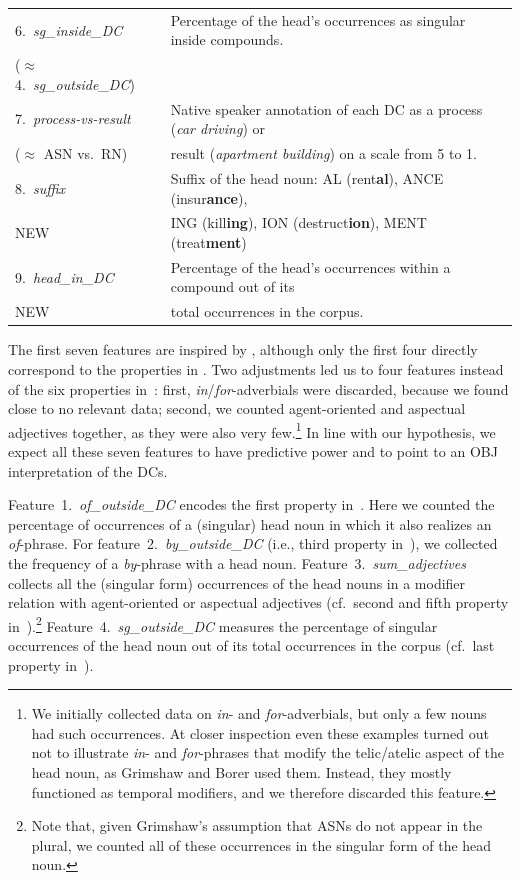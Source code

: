 \documentclass[output=paper]{langsci/langscibook}
\begin{document}
\begin{table}
{\begin{tabular}{|l|l|}
6.\ \textit{sg\_inside\_DC} & Percentage of the head's occurrences as singular inside compounds.\\ 
($\approx$ 4.~\textit{sg\_outside\_DC}) & \\ \hline
7.\ \textit{process-vs-result}& Native speaker annotation of each DC as a process (\textit{car driving}) or  \\ ($\approx$ ASN vs.~RN) & result (\textit{apartment building})  on a scale from 5 to 1.\\
\hline
\hline 
8.\ \textit{suffix} & Suffix of the head noun: AL (rent\textbf{al}), ANCE (insur\textbf{ance}),\\ NEW & 
ING (kill\textbf{ing}), ION (destruct\textbf{ion}), MENT (treat\textbf{ment})\\ \hline
9.\ \textit{head\_in\_DC} & Percentage of the head's occurrences within a compound out of its \\  NEW &  total occurrences in the corpus.\\ \hline
\end{tabular}}
\end{table}


The first seven features are inspired by \cite{grimshaw:90},  {although only the first four directly correspond to the properties in . Two adjustments led us to four features instead of the six properties in~: first, \textit{in}/\textit{for}-adverbials were discarded, because we found close to no relevant data; second, we counted agent-oriented and aspectual adjectives together, as they were also very few.}\footnote{We initially collected data on \textit{in}- and \textit{for}-adverbials, but only a few nouns had such occurrences. At closer inspection even these examples turned out not to illustrate \textit{in}- and \textit{for}-phrases that modify the telic/atelic aspect of the head noun, as Grimshaw and Borer used them. Instead, they mostly functioned as temporal modifiers, and we therefore discarded this feature.}  In line with our hypothesis, we expect all these seven features to have predictive power and to point to an OBJ interpretation of the DCs.

Feature~1.~\textit{of\_outside\_DC} encodes the first property in~. Here we counted the percentage of occurrences of a (singular) head noun in which it also realizes an  \textit{of}-phrase. For feature~2.~\textit{by\_outside\_DC} (i.e., third property in~), we collected the frequency of a \textit{by}-phrase with a head noun. 
 Feature~3.~\textit{sum\_adjectives} collects all the (singular form) occurrences of the head nouns in a modifier relation with agent-oriented or aspectual adjectives (cf.~second and fifth property in~).\footnote{Note that, given Grimshaw's assumption that ASNs do not appear in the plural, we counted all of these occurrences in the singular form of the head noun.} Feature~4.~\textit{sg\_outside\_DC} measures the percentage of singular occurrences of the head noun out of its total occurrences in the corpus  {(cf.~last property in~)}. 
\end{document}
